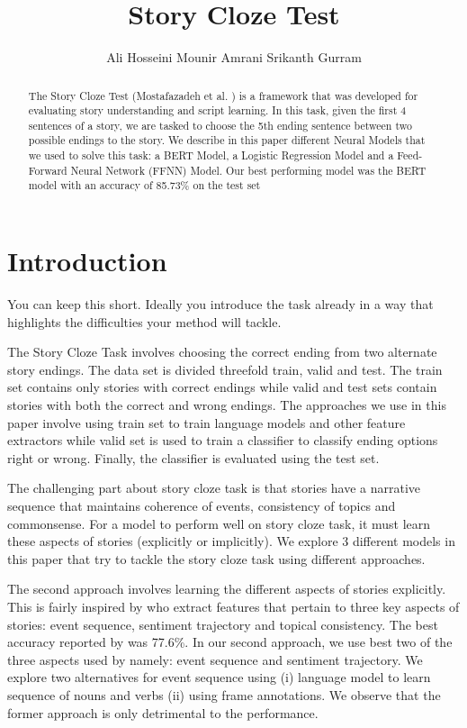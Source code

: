 \documentclass{article}
\title{Story Cloze Test}
\author{Ali Hosseini \qquad Mounir Amrani \qquad Srikanth Gurram}
\begin{document}

\maketitle

\begin{abstract}
The Story Cloze Test (Mostafazadeh et al. \cite{cloze}) is a framework that was developed for evaluating story understanding and script learning. In this task, given the first 4 sentences of a story, we are tasked to choose the 5th ending sentence between two possible endings to the story.
We describe in this paper different Neural Models that we used to solve this task: a BERT Model, a Logistic Regression Model and a Feed-Forward Neural Network (FFNN) Model. Our best performing model was the BERT model with an accuracy of 85.73\% on the test set
\end{abstract}

\section{Introduction}

You can keep this short. Ideally you introduce the task already in a way that highlights the difficulties your method will tackle.

The Story Cloze Task involves choosing the correct ending from two alternate story endings. The data set is divided threefold train, valid and test. The train set contains only stories with correct endings while valid and test sets contain stories with both the correct and wrong endings. The approaches we use in this paper involve using train set to train language models and other feature extractors while valid set is used to train a classifier to classify ending options right or wrong. Finally, the classifier is evaluated using the test set.

The challenging part about story cloze task is that stories have a narrative sequence that maintains coherence of events, consistency of topics and commonsense. For a model to perform well on story cloze task, it must learn these aspects of stories (explicitly or implicitly). We explore 3 different models in this paper that try to tackle the story cloze task using different approaches.

The second approach involves learning the different aspects of stories explicitly. This is fairly inspired by \cite{hcm} who extract features that pertain to three key aspects of stories: event sequence, sentiment trajectory and topical consistency. The best accuracy reported by \cite{hcm} was 77.6\%. In our second approach, we use best two of the three aspects used by \cite{hcm} namely: event sequence and sentiment trajectory. We explore two alternatives for event sequence using (i) language model to learn sequence of nouns and verbs (ii) using frame annotations. We observe that the former approach is only detrimental to the performance.
\end{document}
